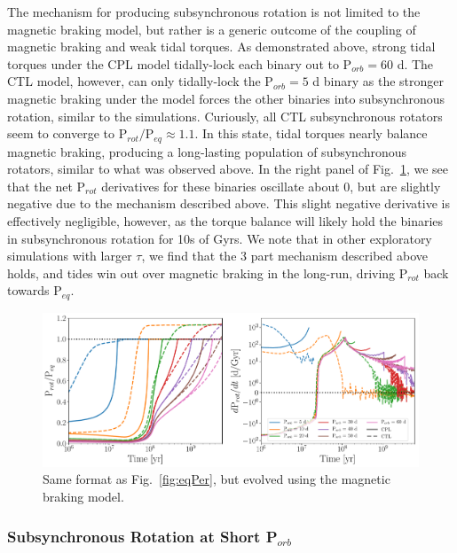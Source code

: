\documentclass[twocolumn]{aastex61}
\begin{document}
The mechanism for producing subsynchronous rotation is not limited to the \citet{Matt2015} magnetic braking model, but rather is a generic outcome of the coupling of magnetic braking and weak tidal torques. As demonstrated above, strong tidal torques under the CPL model tidally-lock each binary out to P$_{orb} = 60$ d. The CTL model, however, can only tidally-lock the P$_{orb} = 5$ d binary as the stronger magnetic braking under the \citet{Reiners2012} model forces the other binaries into subsynchronous rotation, similar to the \citet{Matt2015} simulations. Curiously, all CTL subsynchronous rotators seem to converge to P$_{rot}/$P$_{eq} \approx 1.1$.  In this state, tidal torques nearly balance magnetic braking, producing a long-lasting population of subsynchronous rotators, similar to what was observed above.  In the right panel of Fig.~\ref{fig:eqPerReiners}, we see that the net P$_{rot}$ derivatives for these binaries oscillate about 0, but are slightly negative due to the mechanism described above. This slight negative derivative is effectively negligible, however, as the torque balance will likely hold the binaries in subsynchronous rotation for 10s of Gyrs.  We note that in other exploratory simulations with larger $\tau$, we find that the 3 part mechanism described above holds, and tides win out over magnetic braking in the long-run, driving P$_{rot}$ back towards P$_{eq}$.

\begin{figure}
	\includegraphics[width=\textwidth]{../Plots/eqPerTwoPanelReiners.pdf}
   \caption{Same format as Fig.~\ref{fig:eqPer}, but evolved using the \citet{Reiners2012} magnetic braking model.}%
    \label{fig:eqPerReiners}%
\end{figure}

\subsubsection{Subsynchronous Rotation at Short P$_{orb}$}
\end{document}
